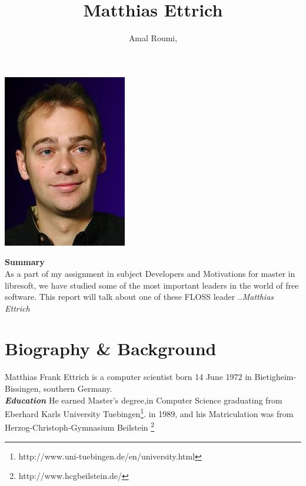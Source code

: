 \documentclass[DIV=calc, paper=a4, fontsize=11pt]{scrartcl}
\title{Matthias Ettrich}
\author {Amal Roumi,}
\date{}
\begin{document}
\maketitle
\thispagestyle{fancy} %

\begin{center}\includegraphics[scale=1.5]{index.jpeg} \end{center}

\abstract
\textbf{Summary} \\
 
As a part of my assignment in subject Developers and Motivations for master in libresoft, we have studied some of the most important leaders in the world of free software.
 This report will talk  about one of these FLOSS leader ..\emph{Matthias Ettrich}
 \\

\tableofcontents
 \newpage

\section{Biography \& Background}

Matthias Frank Ettrich is a computer scientist born 14 June 1972 in Bietigheim-Bissingen, southern Germany.\\

{\Large \textbf{\emph{Education}}}
He earned  Master's degree,in Computer Science graduating from Eberhard Karls University Tuebingen\footnote{http://www.uni-tuebingen.de/en/university.html}. in 1989, and his Matriculation was from  Herzog-Christoph-Gymnasium Beilstein \footnote {http://www.hcgbeilstein.de/}\\
\end{document}
